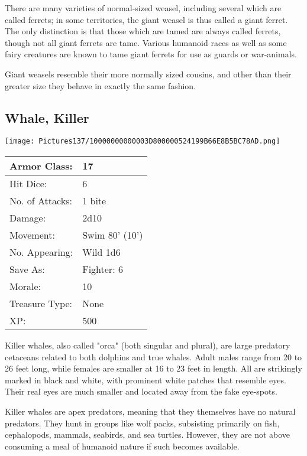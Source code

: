 \documentclass[a4paper,twoside,openany,10pt]{book}
\begin{document}
\begin{multicols}{2}
There are many varieties of normal-sized weasel, including several which are called ferrets; in some territories, the giant weasel is thus called a giant ferret. The only distinction is that those which are tamed are always called ferrets, though not all giant ferrets are tame. Various humanoid races as well as some fairy creatures are known to tame giant ferrets for use as guards or war-animals.

Giant weasels resemble their more normally sized cousins, and other than their greater size they behave in exactly the same fashion.

\subsection*{Whale, Killer}\label{whale-killer}



\begin{center} \texttt{[image: Pictures137/10000000000003D800000524199B66E8B5BC78AD.png]} \end{center}


\begin{tabularx}{0.50\textwidth}{@{}lX@{}}
Armor Class: & 17 \\\hline
Hit Dice: & 6 \\\hline
No. of Attacks: & 1 bite \\\hline
Damage: & 2d10 \\\hline
Movement: & Swim 80' (10') \\\hline
No. Appearing: & Wild 1d6 \\\hline
Save As: & Fighter: 6 \\\hline
Morale: & 10 \\\hline
Treasure Type: & None \\\hline
XP: & 500 \\\hline
\end{tabularx}


Killer whales, also called "orca" (both singular and plural), are large predatory cetaceans related to both dolphins and true whales. Adult males range from 20 to 26 feet long, while females are smaller at 16 to 23 feet in length. All are strikingly marked in black and white, with prominent white patches that resemble eyes. Their real eyes are much smaller and located away from the fake eye-spots.

Killer whales are apex predators, meaning that they themselves have no natural predators. They hunt in groups like wolf packs, subsisting primarily on fish, cephalopods, mammals, seabirds, and sea turtles. However, they are not above consuming a meal of humanoid nature if such becomes available. 



\end{multicols}
\end{document}

